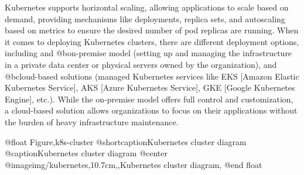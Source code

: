 Kubernetes supports horizontal scaling, allowing applications to scale based on demand, providing mechanisms like deployments, replica sets, and autoscaling based on metrics to ensure the desired number of pod replicas are running. When it comes to deploying Kubernetes clusters, there are different deployment options, including and @b{on-premise model} (setting up and managing the infrastructure in a private data center or physical servers owned by the organization), and @b{cloud-based solutions} (managed Kubernetes services like EKS [Amazon Elastic Kubernetes Service], AKS [Azure Kubernetes Service], GKE [Google Kubernetes Engine], etc.). While the on-premise model offers full control and customization, a cloud-based solution allows organizations to focus on their applications without the burden of heavy infrastructure maintenance.

@float Figure,k8s-cluster
@shortcaption{Kubernetes cluster diagram}
@caption{Kubernetes cluster diagram}
@center @image{img/kubernetes,10.7cm,,Kubernetes cluster diagram,}
@end float
